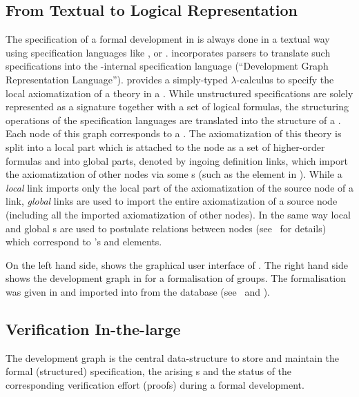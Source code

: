 \subsection{From Textual to Logical Representation}

The specification of a formal development in {\maya} is always done in a textual way using
specification languages like {\casl} , {\omdoc} or {\vsesl}.  {\maya} incorporates parsers
to translate such specifications into the {\maya}-internal specification language {\dgrl}
(``Development Graph Representation Language'').  {\dgrl} provides a simply-typed
$\lambda$-calculus to specify the local axiomatization of a theory in a
{}. While unstructured specifications are solely represented
as a signature together with a set of logical formulas, the structuring operations of the
specification languages are translated into the structure of a
{}. Each node of this graph corresponds to a
{}. The axiomatization of this theory is split into a local part which is
attached to the node as a set of higher-order formulas and into global parts, denoted by
ingoing definition links, which import the axiomatization of other nodes via some
{s} (such as the {} element in {\omdoc}).
While a {\emph{local}} link imports only the local part of the
axiomatization of the source node of a link, {\emph{global}} links are
used to import the entire axiomatization of
\MAYAfigure
a source node (including all the imported axiomatization of other nodes).  In the same
way local and global {s} are used to postulate relations between nodes
(see~\cite{AH-05-a} for details) which correspond to {\omdoc}'s
{} and {} elements.

On the left hand side, {} shows the graphical user interface of
{\maya}. The right hand side shows the development graph in {\maya} for a formalisation of
groups. The formalisation was given in {\omdoc} and imported into {\maya} from the
{\omdoc} database {\mbase} (see~\cite{KohFra:rkcimss01} and {}).

\subsection{Verification In-the-large}

The development graph is the central data-structure to store and maintain the formal
(structured) specification, the arising {s} and the status of
the corresponding verification effort (proofs) during a formal development.

